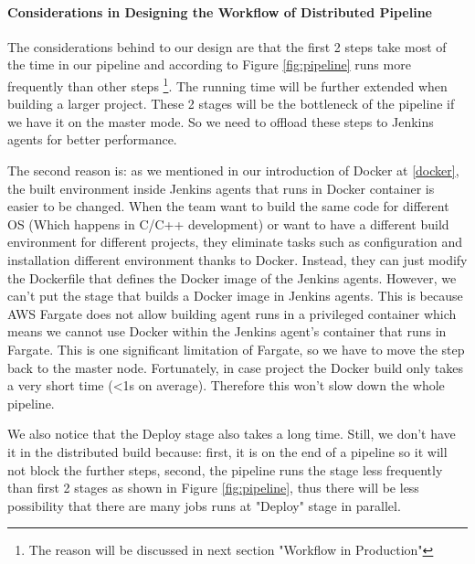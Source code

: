 \paragraph[]{Considerations in Designing the Workflow of Distributed Pipeline}
The considerations behind to our design are that the first 2 steps take most of the time in our pipeline and according to Figure \ref{fig:pipeline} runs more frequently than other steps \footnote{The reason will be discussed in next section "Workflow in Production"}. The running time will be further extended when building a larger project. These 2 stages will be the bottleneck of the pipeline if we have it on the master mode. So we need to offload these steps to Jenkins agents for better performance.
\par
The second reason is: as we mentioned in our introduction of Docker at \ref{docker}, the built environment inside Jenkins agents that runs in Docker container is easier to be changed. When the team want to build the same code for different OS (Which happens in C/C++ development) or want to have a different build environment for different projects, they eliminate tasks such as configuration and installation different environment thanks to Docker. Instead, they can just modify the Dockerfile that defines the Docker image of the Jenkins agents. However, we can't put the stage that builds a Docker image in Jenkins agents. This is because AWS Fargate does not allow building agent runs in a privileged container which means we cannot use Docker within the Jenkins agent's container that runs in Fargate. This is one significant limitation of Fargate, so we have to move the step back to the master node. Fortunately, in case project the Docker build only takes a very short time (<1s on average). Therefore this won't slow down the whole pipeline.
\par
We also notice that the Deploy stage also takes a long time. Still, we don't have it in the distributed build because: first, it is on the end of a pipeline so it will not block the further steps, second, the pipeline runs the stage less frequently than first 2 stages as shown in Figure \ref{fig:pipeline}, thus there will be less possibility that there are many jobs runs at "Deploy" stage in parallel.
